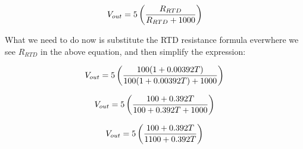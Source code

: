 $$V_{out} = 5 \left(R_{RTD} \over R_{RTD} + 1000 \right)$$

What we need to do now is substitute the RTD resistance formula everwhere we see $R_{RTD}$ in the above equation, and then simplify the expression:

$$V_{out} = 5 \left(100(1 + 0.00392T) \over 100(1 + 0.00392T) + 1000 \right)$$

$$V_{out} = 5 \left(100 + 0.392T \over 100 + 0.392T + 1000 \right)$$

\vskip 10pt

$$V_{out} = 5 \left({100 + 0.392 T} \over {1100 + 0.392 T}\right)$$




